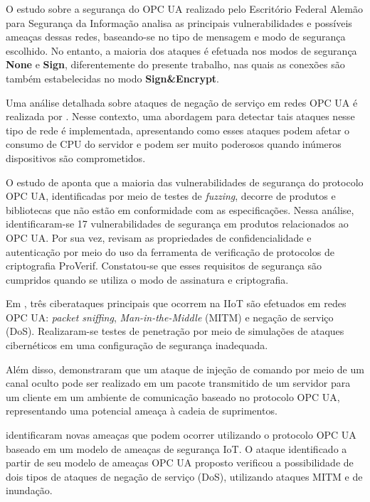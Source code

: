     O estudo sobre a segurança do OPC UA realizado pelo Escritório Federal Alemão para Segurança da Informação \cite{bsi2017} analisa as principais vulnerabilidades e possíveis ameaças dessas redes, baseando-se no tipo de mensagem e modo de segurança escolhido. No entanto, a maioria dos ataques é efetuada nos modos de segurança \textbf{None} e \textbf{Sign}, diferentemente do presente trabalho, nas quais as conexões são também estabelecidas no modo \textbf{Sign\&Encrypt}.

    Uma análise detalhada sobre ataques de negação de serviço em redes OPC UA é realizada por . Nesse contexto, uma abordagem para detectar tais ataques nesse tipo de rede é implementada, apresentando como esses ataques podem afetar o consumo de CPU do servidor e podem ser muito poderosos quando inúmeros dispositivos são comprometidos.

    O estudo de \cite{kaspersky2018} aponta que a maioria das vulnerabilidades de segurança do protocolo OPC UA, identificadas por meio de testes de \textit{fuzzing}, decorre de produtos e bibliotecas que não estão em conformidade com as especificações. Nessa análise, identificaram-se 17 vulnerabilidades de segurança em produtos relacionados ao OPC UA. Por sua vez,  revisam as propriedades de confidencialidade e autenticação por meio do uso da ferramenta de verificação de protocolos de criptografia ProVerif. Constatou-se que esses requisitos de segurança são cumpridos quando se utiliza o modo de assinatura e criptografia.

    Em \cite{varadarajan2022}, três ciberataques principais que ocorrem na IIoT são efetuados em redes OPC UA: \textit{packet sniffing}, \textit{Man-in-the-Middle} (MITM) e negação de serviço (DoS). Realizaram-se testes de penetração por meio de simulações de ataques cibernéticos em uma configuração de segurança inadequada.

    Além disso,  demonstraram que um ataque de injeção de comando por meio de um canal oculto pode ser realizado em um pacote transmitido de um servidor para um cliente em um ambiente de comunicação baseado no protocolo OPC UA, representando uma potencial ameaça à cadeia de suprimentos.

     identificaram novas ameaças que podem ocorrer utilizando o protocolo OPC UA baseado em um modelo de ameaças de segurança IoT. O ataque identificado a partir de seu modelo de ameaças OPC UA proposto verificou a possibilidade de dois tipos de ataques de negação de serviço (DoS), utilizando ataques MITM e de inundação.

